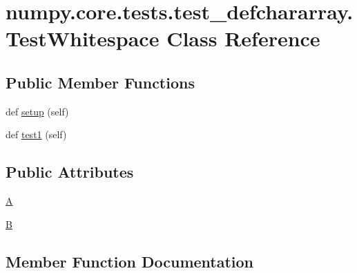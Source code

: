 \hypertarget{classnumpy_1_1core_1_1tests_1_1test__defchararray_1_1TestWhitespace}{}\section{numpy.\+core.\+tests.\+test\+\_\+defchararray.\+Test\+Whitespace Class Reference}
\label{classnumpy_1_1core_1_1tests_1_1test__defchararray_1_1TestWhitespace}
\subsection*{Public Member Functions}
\begin{DoxyCompactItemize}
\item 
def \hyperlink{classnumpy_1_1core_1_1tests_1_1test__defchararray_1_1TestWhitespace_a5ffec7e2e937f26c2d54d4ed388cb9ee}{setup} (self)
\item 
def \hyperlink{classnumpy_1_1core_1_1tests_1_1test__defchararray_1_1TestWhitespace_aa74efd1d867c147a8a83a9396b3e07e3}{test1} (self)
\end{DoxyCompactItemize}
\subsection*{Public Attributes}
\begin{DoxyCompactItemize}
\item 
\hyperlink{classnumpy_1_1core_1_1tests_1_1test__defchararray_1_1TestWhitespace_a782b8d07da743f3cd7894879d378f3d3}{A}
\item 
\hyperlink{classnumpy_1_1core_1_1tests_1_1test__defchararray_1_1TestWhitespace_a9ad91d89f0c66648488a5b5dfe81ca40}{B}
\end{DoxyCompactItemize}


\subsection{Member Function Documentation}
\mbox{\label{classnumpy_1_1core_1_1tests_1_1test__defchararray_1_1TestWhitespace_a5ffec7e2e937f26c2d54d4ed388cb9ee}} 
